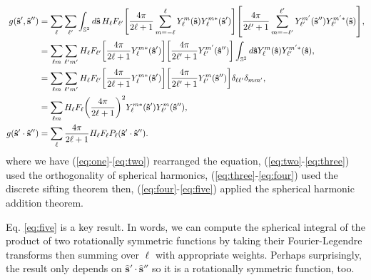 \documentclass[11pt]{article}
\providecommand{\mh}[1]{\mathbf{\hat{#1}}}
\providecommand{\mbb}[1]{\mathbb{#1}}
\providecommand{\ints}[1]{\int_{\mbb{S}^{#1}}}
\let\originalleft\left
\let\originalright\right
\renewcommand{\left}{\mathopen{}\mathclose\bgroup\originalleft}
\renewcommand{\right}{\aftergroup\egroup\originalright}
\begin{document}
\begin{align}
  g(\mh{s}',\mh{s}'') &= \sum_{\ell}\sum_{\ell'} \ints{2}d\mh{s}\,H_\ell F_{\ell'} \left[\frac{4\pi}{2\ell + 1}\sum_{m=-\ell}^{\ell}Y_\ell^m(\mh{s})Y_\ell^{m*}(\mh{s}')\right]\left[\frac{4\pi}{2\ell' + 1}\sum_{m=-\ell'}^{\ell'}Y_{\ell'}^{m'}(\mh{s}'')Y_{\ell'}^{m'*}(\mh{s})\right],\label{eq:one}\\ 
                      &= \sum_{\ell m}\sum_{\ell' m'} H_\ell F_{\ell'} \left[\frac{4\pi}{2\ell + 1}Y_\ell^{m*}(\mh{s}')\right]\left[\frac{4\pi}{2\ell' + 1}Y_{\ell'}^{m'}(\mh{s}'')\right]\ints{2}d\mh{s}Y_\ell^m(\mh{s})Y_{\ell'}^{m'*}(\mh{s}),\label{eq:two}\\
                      &= \sum_{\ell m}\sum_{\ell' m'} H_\ell F_{\ell'} \left[\frac{4\pi}{2\ell + 1}Y_\ell^{m*}(\mh{s}')\right]\left[\frac{4\pi}{2\ell' + 1}Y_{\ell'}^m(\mh{s}'')\right]\delta_{\ell\ell'}\delta_{m m'},\label{eq:three}\\
                      &= \sum_{\ell m}H_\ell F_{\ell} \left(\frac{4\pi}{2\ell + 1}\right)^2 Y_\ell^{m*}(\mh{s}')Y_{\ell'}^m(\mh{s}''),\label{eq:four}\\
  g(\mh{s}'\cdot\mh{s}'') &= \sum_{\ell}\frac{4\pi}{2\ell + 1}H_\ell F_{\ell} P_\ell(\mh{s}'\cdot\mh{s}'').\label{eq:five}
\end{align}
where we have (\ref{eq:one}-\ref{eq:two}) rearranged the equation,
(\ref{eq:two}-\ref{eq:three}) used the orthogonality of spherical harmonics,
(\ref{eq:three}-\ref{eq:four}) used the discrete sifting theorem then,
(\ref{eq:four}-\ref{eq:five}) applied the spherical harmonic addition theorem.

Eq. \eqref{eq:five} is a key result. In words, we can compute the spherical
integral of the product of two rotationally symmetric functions by taking their
Fourier-Legendre transforms then summing over $\ell$ with appropriate weights.
Perhaps surprisingly, the result only depends on $\mh{s}'\cdot\mh{s}''$ so it is
a rotationally symmetric function, too.  
\end{document}
